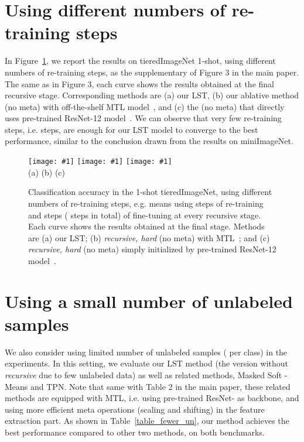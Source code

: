 \documentclass{article}
\begin{document}
\section{Using different numbers of re-training steps}
\label{sec_supple_fig3}

In Figure~\ref{figure_re_train}, we report the results on tieredImageNet 1-shot, using different numbers of re-training steps, as the supplementary 
of Figure 3 in the main paper.
The same as in Figure 3, each curve shows the results obtained at the final recursive stage. Corresponding methods are (a) our LST, (b) our ablative method  (no meta) with off-the-shelf MTL model~\cite{SunCVPR2019}, and (c) the  (no meta) that directly uses pre-trained ResNet-12 model~\cite{SunCVPR2019}.
We can observe that very few re-training steps, i.e.  steps, are enough for our LST model to converge to the best performance, similar to the conclusion drawn from the results on miniImageNet.


\begin{figure}[t]
\newcommand{\plotexpone}[1]{\texttt{[image: \#1]}}
\plotexpone{supple_figures/figureSa.eps}
\plotexpone{supple_figures/figureSb.eps}
\plotexpone{supple_figures/figureSc.eps}\\
\hspace*{2.31cm} (a) \hspace{4.18cm}(b) \hspace{4.18cm}(c)\\
\hspace*{2.40cm} 
\vspace{-0.2cm}
\caption{Classification accuracy in the 1-shot tieredImageNet, using different numbers of re-training steps, e.g.  means using  steps of re-training and  steps ( steps in total) of fine-tuning at every recursive stage. 
Each curve shows the results obtained at the final stage. Methods are (a) our LST; (b) \emph{recursive, hard} (no meta) with MTL~\cite{SunCVPR2019}; and (c) \emph{recursive, hard} (no meta) simply initialized by pre-trained ResNet-12 model~\cite{SunCVPR2019}.
}
\label{figure_re_train}
\end{figure} 


\section{Using a small number of unlabeled samples}
\label{sec_fewer_data}

We also consider using limited number of unlabeled samples ( per class) in the experiments.
In this setting, we evaluate our LST method (the version without \emph{recursive} due to few unlabeled data) as well as related methods, Masked Soft -Means and TPN.
Note that same with Table 2 in the main paper, these related methods are equipped with MTL, i.e. using pre-trained ResNet- as backbone, and using more efficient meta operations (scaling and shifting) in the feature extraction part.
As shown in Table~\ref{table_fewer_un}, our method achieves the best performance compared to other two methods, on both benchmarks.
\end{document}
